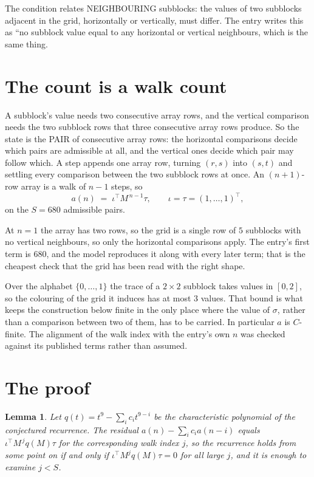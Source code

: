 \documentclass[11pt,a4paper]{article}
\theoremstyle{plain}
\newtheorem{lemma}[theorem]{Lemma}
\theoremstyle{definition}
\begin{document}
The condition relates NEIGHBOURING subblocks: the values of two subblocks adjacent in the grid,
horizontally or vertically, must differ. The entry writes this as ``no subblock value equal to any horizontal or vertical neighbours, which is the same thing.

\section{The count is a walk count}

A subblock's value needs two consecutive array rows, and the vertical
comparison needs the two subblock rows that three consecutive array rows produce. So the state
is the PAIR of consecutive array rows: the horizontal comparisons decide which pairs are
admissible at all, and the vertical ones decide which pair may follow which. A step appends one
array row, turning $(r,s)$ into $(s,t)$ and settling every comparison between the two subblock
rows at once. An $(n+1)$-row array is a walk of $n-1$ steps, so
\[
a(n)\;=\;\iota^{\!\top}M^{\,n-1}\tau,\qquad\iota=\tau=(1,\dots,1)^{\!\top},
\]
on the $S=680$ admissible pairs.

At $n=1$ the array has two rows, so the grid is a single row of $5$
subblocks with no vertical neighbours, so only the horizontal comparisons apply. The
entry's first term is $680$, and the model reproduces it along with every later term; that
is the cheapest check that the grid has been read with the right shape.

Over the alphabet $\{0,\dots,1\}$ the trace of a $2\times2$ subblock takes values in
$[0,2]$, so the colouring of the grid it induces has at most $3$ values.
That bound is what keeps the construction below finite in the only place where the value of
$\sigma$, rather than a comparison between two of them, has to be carried.
In particular $a$ is $C$-finite. The alignment of the walk index with the entry's own $n$ was
checked against its published terms rather than assumed.

\section{The proof}

\begin{lemma}\label{lem:crit}
Let $q(t)=t^{9}-\sum_i c_it^{9-i}$ be the characteristic polynomial of the
conjectured recurrence. The residual $a(n)-\sum_ic_ia(n-i)$ equals
$\iota^{\!\top}M^{\,j}q(M)\tau$ for the corresponding walk index $j$, so the recurrence
holds from some point on if and only if $\iota^{\!\top}M^{j}q(M)\tau=0$ for all large $j$,
and it is enough to examine $j<S$.
\end{lemma}
\end{document}

